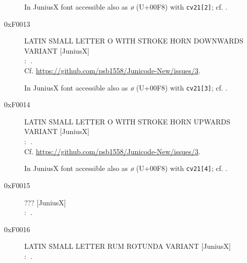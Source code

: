 \documentclass{article}
\newcommand{\Jglyph}[1]{{\relsize{2}\J#1}}
\begin{document}
\begin{description}
  In JuniusX font accessible also as \textit{ø} (U+00F8) with \texttt{cv21[2]};
  cf. \autocite[p. 9]{baker20:_opent_featur_junius_junius}.
\item [0xF0013] LATIN SMALL LETTER O WITH STROKE HORN DOWNWARDS VARIANT [JuniusX]\\:
  \Jglyph{󰀓}.\\  Cf. \url{https://github.com/psb1558/Junicode-New/issues/3}.

  In JuniusX font accessible also as \textit{ø} (U+00F8) with \texttt{cv21[3]};
  cf. \autocite[p. 9]{baker20:_opent_featur_junius_junius}.
\item [0xF0014] LATIN SMALL LETTER O WITH STROKE HORN UPWARDS VARIANT [JuniusX]\\:
  \Jglyph{󰀓}.\\  Cf. \url{https://github.com/psb1558/Junicode-New/issues/3}.

  In JuniusX font accessible also as \textit{ø} (U+00F8) with \texttt{cv21[4]};
  cf. \autocite[p. 9]{baker20:_opent_featur_junius_junius}.
\item [0xF0015] ???  [JuniusX]\\:
  \Jglyph{󰀕}.\\%
\item [0xF0016] LATIN SMALL LETTER RUM ROTUNDA VARIANT [JuniusX]\\:
  \Jglyph{󰀖}.\\%


\end{description}
\end{document}
